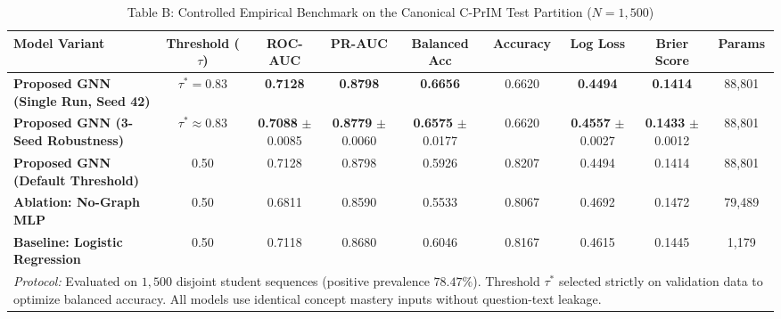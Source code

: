 \begin{table}[t]
\centering
\caption{Table B: Controlled Empirical Benchmark on the Canonical C-PrIM Test Partition ($N=1,500$)}
\label{tab:local_benchmark}
\small
\begin{tabular}{lcccccccc}
\hline
\textbf{Model Variant} & \textbf{Threshold ($\tau$)} & \textbf{ROC-AUC} & \textbf{PR-AUC} & \textbf{Balanced Acc} & \textbf{Accuracy} & \textbf{Log Loss} & \textbf{Brier Score} & \textbf{Params} \\
\hline
\textbf{Proposed GNN (Single Run, Seed 42)} & $\tau^* = 0.83$ & \textbf{0.7128} & \textbf{0.8798} & \textbf{0.6656} & 0.6620 & \textbf{0.4494} & \textbf{0.1414} & 88,801 \\
\textbf{Proposed GNN (3-Seed Robustness)} & $\tau^* \approx 0.83$ & \textbf{0.7088} $\pm$ 0.0085 & \textbf{0.8779} $\pm$ 0.0060 & \textbf{0.6575} $\pm$ 0.0177 & 0.6620 & \textbf{0.4557} $\pm$ 0.0027 & \textbf{0.1433} $\pm$ 0.0012 & 88,801 \\
\textbf{Proposed GNN (Default Threshold)} & 0.50 & 0.7128 & 0.8798 & 0.5926 & 0.8207 & 0.4494 & 0.1414 & 88,801 \\
\textbf{Ablation: No-Graph MLP} & 0.50 & 0.6811 & 0.8590 & 0.5533 & 0.8067 & 0.4692 & 0.1472 & 79,489 \\
\textbf{Baseline: Logistic Regression} & 0.50 & 0.7118 & 0.8680 & 0.6046 & 0.8167 & 0.4615 & 0.1445 & 1,179 \\
\hline
\multicolumn{9}{p{16.5cm}}{\textit{Protocol:} Evaluated on $1,500$ disjoint student sequences (positive prevalence $78.47\%$). Threshold $\tau^*$ selected strictly on validation data to optimize balanced accuracy. All models use identical concept mastery inputs without question-text leakage.}
\end{tabular}
\end{table}
